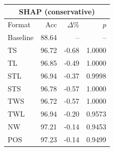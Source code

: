 \begin{tabular}{lrrr}
\toprule
\multicolumn{4}{c}{\textbf{SHAP (conservative)}} \\
\midrule
Format & Acc & $\Delta$\% & $p$ \\
\midrule
Baseline & 88.64 & -- & -- \\
\midrule
TS & 96.72 & -0.68 & 1.0000 \\
TL & 96.85 & -0.49 & 1.0000 \\
STL & 96.94 & -0.37 & 0.9998 \\
STS & 96.78 & -0.57 & 1.0000 \\
TWS & 96.72 & -0.57 & 1.0000 \\
TWL & 96.94 & -0.20 & 0.9573 \\
NW & 97.21 & -0.14 & 0.9453 \\
POS & 97.23 & -0.14 & 0.9499 \\
\bottomrule
\end{tabular}